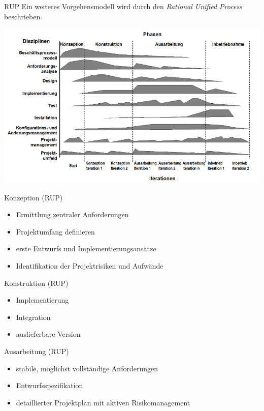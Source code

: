 \begin{defi}{RUP}
    Ein weiteres Vorgehensmodell wird durch den \emph{Rational Unified Process} beschrieben.

    \includegraphics[width=\textwidth]{includes/figures/RUP.png}
\end{defi}

\begin{bonus}{Konzeption (RUP)}
    \begin{itemize}
        \item Ermittlung zentraler Anforderungen
        \item Projektumfang definieren
        \item erste Entwurfs und Implementierungsansätze
        \item Identifikation der Projektrisiken und Aufwände
    \end{itemize}
\end{bonus}

\begin{bonus}{Konstruktion (RUP)}
    \begin{itemize}
        \item Implementierung
        \item Integration
        \item auslieferbare Version
    \end{itemize}
\end{bonus}

\begin{bonus}{Ausarbeitung (RUP)}
    \begin{itemize}
        \item stabile, möglichst vollständige Anforderungen
        \item Entwurfsspezifikation
        \item detaillierter Projektplan mit aktiven Risikomanagement
    \end{itemize}
\end{bonus}

